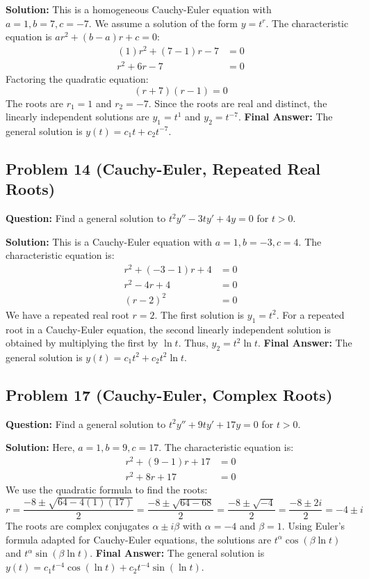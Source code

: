\documentclass{article}
\begin{document}
\textbf{Solution:}
This is a homogeneous Cauchy-Euler equation with $a=1, b=7, c=-7$.
We assume a solution of the form $y = t^r$. The characteristic equation is $ar^2 + (b-a)r + c = 0$:
\begin{align*}
(1)r^2 + (7 - 1)r - 7 &= 0 \\
r^2 + 6r - 7 &= 0
\end{align*}
Factoring the quadratic equation:
\[ (r+7)(r-1) = 0 \]
The roots are $r_1 = 1$ and $r_2 = -7$. Since the roots are real and distinct, the linearly independent solutions are $y_1 = t^1$ and $y_2 = t^{-7}$.
\textbf{Final Answer:} The general solution is $y(t) = c_1 t + c_2 t^{-7}$.

\subsection{Problem 14 (Cauchy-Euler, Repeated Real Roots)}
\textbf{Question:} Find a general solution to $t^2 y'' - 3ty' + 4y = 0$ for $t > 0$.

\textbf{Solution:}
This is a Cauchy-Euler equation with $a=1, b=-3, c=4$.
The characteristic equation is:
\begin{align*}
r^2 + (-3 - 1)r + 4 &= 0 \\
r^2 - 4r + 4 &= 0 \\
(r-2)^2 &= 0
\end{align*}
We have a repeated real root $r = 2$. The first solution is $y_1 = t^2$. For a repeated root in a Cauchy-Euler equation, the second linearly independent solution is obtained by multiplying the first by $\ln t$. Thus, $y_2 = t^2 \ln t$.
\textbf{Final Answer:} The general solution is $y(t) = c_1 t^2 + c_2 t^2 \ln t$.

\subsection{Problem 17 (Cauchy-Euler, Complex Roots)}
\textbf{Question:} Find a general solution to $t^2 y'' + 9ty' + 17y = 0$ for $t > 0$.

\textbf{Solution:}
Here, $a=1, b=9, c=17$. The characteristic equation is:
\begin{align*}
r^2 + (9 - 1)r + 17 &= 0 \\
r^2 + 8r + 17 &= 0
\end{align*}
We use the quadratic formula to find the roots:
\[ r = \frac{-8 \pm \sqrt{64 - 4(1)(17)}}{2} = \frac{-8 \pm \sqrt{64 - 68}}{2} = \frac{-8 \pm \sqrt{-4}}{2} = \frac{-8 \pm 2i}{2} = -4 \pm i \]
The roots are complex conjugates $\alpha \pm i\beta$ with $\alpha = -4$ and $\beta = 1$.
Using Euler's formula adapted for Cauchy-Euler equations, the solutions are $t^\alpha \cos(\beta \ln t)$ and $t^\alpha \sin(\beta \ln t)$.
\textbf{Final Answer:} The general solution is $y(t) = c_1 t^{-4} \cos(\ln t) + c_2 t^{-4} \sin(\ln t)$.
\end{document}
